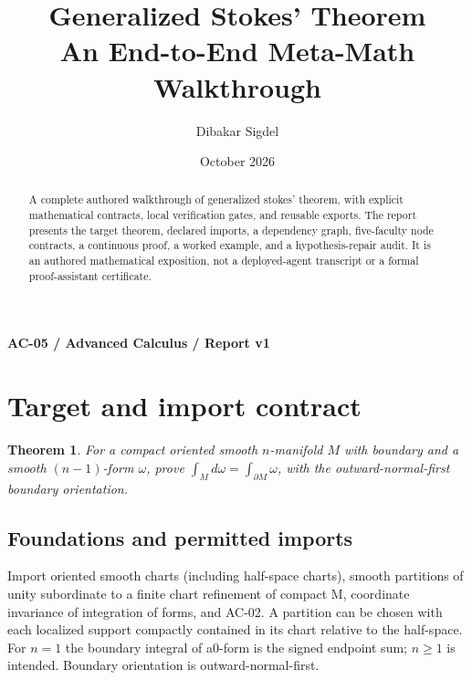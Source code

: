 \documentclass[preprint,12pt,aps,pra,showkeys,amsmath,amssymb,superscriptaddress,floatfix]{revtex4-2}
\newtheorem{theorem}{Theorem}[section]
\theoremstyle{definition}
\theoremstyle{remark}
\begin{document}
\title{Generalized Stokes' Theorem\\[4pt]\large An End-to-End Meta-Math Walkthrough}

\author{Dibakar Sigdel}


\date{October 2026}

\begin{abstract}

A complete authored walkthrough of generalized stokes' theorem, with
explicit mathematical contracts, local verification gates, and reusable
exports. The report presents the target theorem, declared imports, a
dependency graph, five-faculty node contracts, a continuous proof, a
worked example, and a hypothesis-repair audit. It is an authored
mathematical exposition, not a deployed-agent transcript or a formal
proof-assistant certificate.

\end{abstract}\maketitle\linespread{1.12}\selectfont

\noindent\textbf{AC-05 / Advanced Calculus / Report v1}

\section{Target and import contract}

\begin{theorem}

For a compact oriented smooth \(n\)-manifold \(M\) with boundary and a
smooth \((n-1)\)-form \(\omega\), prove
\(\int_M d\omega=\int_{\partial M}\omega\), with the
outward-normal-first boundary orientation.

\end{theorem}

\subsection{Foundations and permitted imports}

Import oriented smooth charts (including half-space charts), smooth
partitions of unity subordinate to a finite chart refinement of compact
M, coordinate invariance of integration of forms, and AC-02. A partition
can be chosen with each localized support compactly contained in its
chart relative to the half-space. For \(n=1\) the boundary integral of
a0-form is the signed endpoint sum; \(n\ge 1\) is intended. Boundary
orientation is outward-normal-first.
\end{document}
